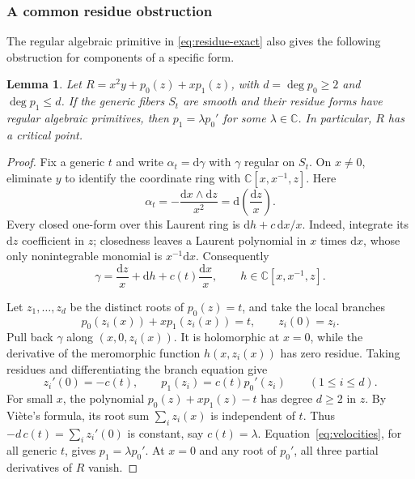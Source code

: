 \documentclass[11pt,reqno]{amsart}
\numberwithin{equation}{section}
\theoremstyle{plain}
\newtheorem{lemma}[theorem]{Lemma}
\theoremstyle{definition}
\theoremstyle{remark}
\newcommand{\C}{\mathbb C}
\newcommand{\dd}{\mathrm d}
\begin{document}
\subsubsection{A common residue obstruction}
The regular algebraic primitive in \eqref{eq:residue-exact} also gives the
following obstruction for components of a specific form.
\begin{lemma}\label{lem:period}
Let $R=x^2y+p_0(z)+xp_1(z)$, with $d=\deg p_0\ge2$ and $\deg p_1\le d$.
If the generic fibers $S_t$ are smooth and their residue forms have regular algebraic primitives, then $p_1=\lambda p_0'$ for some $\lambda\in\C$.
In particular, $R$ has a critical point.
\end{lemma}
\begin{proof}
Fix a generic $t$ and write $\alpha_t=\dd\gamma$ with $\gamma$ regular on $S_t$.
On $x\ne0$, eliminate $y$ to identify the coordinate ring with $\C[x,x^{-1},z]$. Here
\[
\alpha_t=-\frac{\dd x\wedge\dd z}{x^2}=\dd\left(\frac{\dd z}{x}\right).
\]
Every closed one-form over this Laurent ring is $\dd h+c\,\dd x/x$.
Indeed, integrate its $\dd z$ coefficient in $z$; closedness leaves a Laurent polynomial in $x$ times $\dd x$, whose only nonintegrable monomial is $x^{-1}\dd x$.
Consequently
\[
\gamma=\frac{\dd z}{x}+\dd h+c(t)\frac{\dd x}{x},
\qquad h\in\C[x,x^{-1},z].
\]

Let $z_1,\ldots,z_d$ be the distinct roots of $p_0(z)=t$, and take the local branches
\[
p_0(z_i(x))+xp_1(z_i(x))=t,\qquad z_i(0)=z_i.
\]
Pull back $\gamma$ along $(x,0,z_i(x))$. It is holomorphic at $x=0$, while the derivative of the meromorphic function $h(x,z_i(x))$ has zero residue.
Taking residues and differentiating the branch equation give
\begin{equation}\label{eq:velocities}
z_i'(0)=-c(t),\qquad p_1(z_i)=c(t)p_0'(z_i)\qquad(1\le i\le d).
\end{equation}
For small $x$, the polynomial $p_0(z)+xp_1(z)-t$ has degree $d\ge2$ in $z$. By Vi\`ete's formula, its root sum $\sum_i z_i(x)$ is independent of $t$.
Thus $-d\,c(t)=\sum_i z_i'(0)$ is constant, say $c(t)=\lambda$.
Equation~\eqref{eq:velocities}, for all generic $t$, gives $p_1=\lambda p_0'$.
At $x=0$ and any root of $p_0'$, all three partial derivatives of $R$ vanish.
\end{proof}
\end{document}
